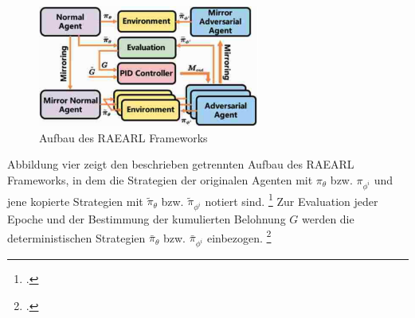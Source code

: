 \begin{figure}[htb]
    \centering
    \includegraphics[height=4cm]{lib/graphics/RAEARL Framework.png}
    \caption[Aufbau des RAEARL Frameworks]{Aufbau des RAEARL Frameworks\footnotemark}
    \label{abb:RAEARL}
\end{figure}

Abbildung vier zeigt den beschrieben getrennten Aufbau des RAEARL Frameworks, in dem die Strategien der originalen Agenten mit $\pi_{\theta}$ bzw. $\pi_{\phi^{i}}$ und jene kopierte Strategien mit $\widetilde{\pi}_{\theta}$ bzw. $\widetilde{\pi}_{\phi^{i}}$ notiert sind. \footcite[Vgl.][S. 3]{Zhai.2022}
Zur Evaluation jeder Epoche und der Bestimmung der kumulierten Belohnung $G$ werden die deterministischen Strategien $\bar{\pi}_{\theta}$ bzw. $\bar{\pi}_{\phi^{i}}$ einbezogen. \footcite[Vgl.][S.3]{Zhai.2022}